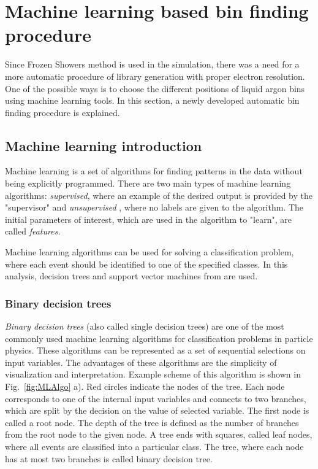 \begin{figure}[!tbp]
\end{figure}

\section{Machine learning based bin finding procedure}\label{sec:MLBinning}

Since Frozen Showers method is used in the \atlas simulation, there was a need for a more automatic procedure of library generation with proper electron resolution. One of the possible ways is to choose the different positions of liquid argon bins using machine learning tools. In this section, a newly developed automatic bin finding procedure is explained.

\subsection{Machine learning introduction} 

Machine learning is a set of algorithms for finding patterns in the data without being explicitly programmed. There are two main types of machine learning algorithms: \textit{supervised}, where an example of the desired output is provided by the "supervisor" and \textit{unsupervised} , where no labels are given to the algorithm\cite{0070428077}. The initial parameters of interest, which are used in the algorithm to "learn", are called \textit{features}. 

Machine learning algorithms can be used for solving a classification problem, where each event should be identified to one of the specified classes. In this analysis, decision trees and support vector machines from \cite{scikit-learn} are used. 

\subsubsection{Binary decision trees}

\textit{Binary decision trees}\cite{cart84-2} (also called single decision trees) are one of the most commonly used machine learning algorithms for classification problems in particle physics. These algorithms can be represented as a set of sequential selections on input variables. The advantages of these algorithms are the simplicity of visualization and interpretation. 
Example scheme of this algorithm is shown in Fig.~\ref{fig:MLAlgo} a). Red circles indicate the nodes of the tree. Each node corresponds to one of the internal input variables and connects to two branches, which are split by the decision on the value of selected variable. The first node is called a root node. The depth of the tree is defined as the number of branches from the root node to the given node. A tree ends with squares, called leaf nodes, where all events are classified into a particular class. The tree, where each node has at most two branches is called binary decision tree.

